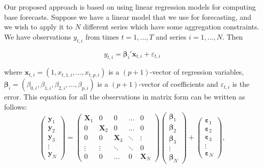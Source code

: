 \documentclass[11pt,a4paper,]{article}
\begin{document}
Our proposed approach is based on using linear regression models for computing base forecasts. Suppose we have a linear model that we use for forecasting, and we wish to apply it to \(N\) different series which have some aggregation constraints. We have observations \(y_{t,i}\) from times \(t=1,\dots,T\) and series \(i=1,\dots,N\). Then

\begin{equation}
\label{eq:basicequation}
  y_{t,i} = \bm{\beta}_{i}' \bm{x}_{t,i} + \varepsilon_{t,i}
\end{equation}

where \(\bm{x}_{t,i}= (1, x_{t,1,i},\dots,x_{t,p,i})\) is a \((p+1)\)-vector of regression variables, \({\bm{\beta}}_i = (\beta_{0,i}, \beta_{1,i}, \beta_{2,i}, \dots, \beta_{p,i})\) is a \((p+1)\)-vector of coefficients and \({\varepsilon}_{t,i}\) is the error. This equation for all the observations in matrix form can be written as follows:
\begin{equation}\label{eq:linearmodel}
  \begin{pmatrix}
  \bm{y}_1\\
  \bm{y}_2\\
  \bm{y}_3 \\
  \vdots\\
  \bm{y}_N
  \end{pmatrix}=
  \begin{pmatrix}
  \bm{X}_1 & 0        & 0        & \dots  & 0\\
  0        & \bm{X}_2 & 0        & \dots  & 0\\
  0        & 0        & \bm{X}_3 & \ddots & \vdots \\
  \vdots   & \vdots   & \ddots   & \ddots & 0\\
  0        & 0        & \dots    & 0      & \bm{X}_N
  \end{pmatrix}
  \begin{pmatrix}
  \bm{\beta}_1\\
  \bm{\beta}_2\\
  \bm{\beta}_3\\
  \vdots\\
  \bm{\beta}_N
  \end{pmatrix}+
  \begin{pmatrix}
  \bm{\varepsilon}_1\\
  \bm{\varepsilon}_2\\
  \bm{\varepsilon}_3\\
  \vdots \\
  \bm{\varepsilon}_N
  \end{pmatrix},
\end{equation}
\end{document}
